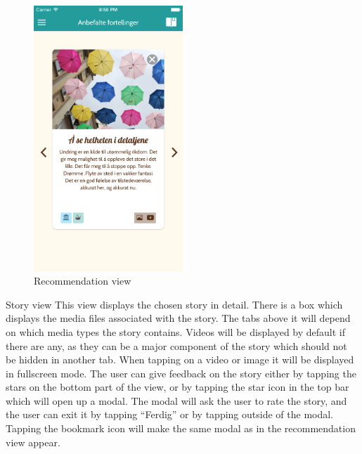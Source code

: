 \begin{figure}[h!]
	\centering
	\includegraphics[width=0.5\textwidth]{fig/recommendation_view}
	\caption{Recommendation view}
	\label{recommendation_view}
\end{figure}

Story view\newline
This view displays the chosen story in detail. There is a box which displays the media files associated with the story. The tabs above it will depend on which media types the story contains. Videos will be displayed by default if there are any, as they can be a major component of the story which should not be hidden in another tab. When tapping on a video or image it will be displayed in fullscreen mode. The user can give feedback on the story either by tapping the stars on the bottom part of the view, or by tapping the star icon in the top bar which will open up a modal. The modal will ask the user to rate the story, and the user can exit it by tapping “Ferdig” or by tapping outside of the modal. Tapping the bookmark icon will make the same modal as in the recommendation view appear.

